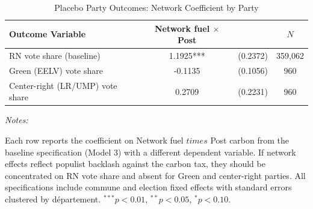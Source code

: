 \begin{table}[!h]
\centering
\caption{Placebo Party Outcomes: Network Coefficient by Party}
\centering
\fontsize{10}{12}\selectfont
\begin{threeparttable}
\begin{tabular}[t]{lccc}
\toprule
Outcome Variable & Network fuel $\times$ Post &  & $N$\\
\midrule
RN vote share (baseline) & 1.1925*** & (0.2372) & 359,062\\
Green (EELV) vote share & -0.1135 & (0.1056) & 960\\
Center-right (LR/UMP) vote share & 0.2709 & (0.2231) & 960\\
\bottomrule
\end{tabular}
\begin{tablenotes}
\item \textit{Notes:} 
\item Each row reports the coefficient on Network fuel $times$ Post carbon from the baseline specification (Model 3) with a different dependent variable. If network effects reflect populist backlash against the carbon tax, they should be concentrated on RN vote share and absent for Green and center-right parties. All specifications include commune and election fixed effects with standard errors clustered by d\'{e}partement. $^{***}p<0.01$, $^{**}p<0.05$, $^{*}p<0.10$.
\end{tablenotes}
\end{threeparttable}
\end{table}
